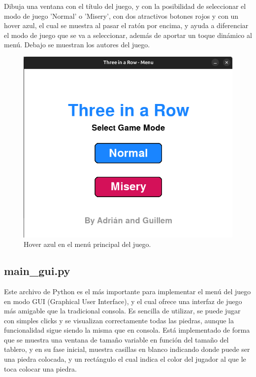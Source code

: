 \documentclass[a4paper,12pt]{article}
\begin{document}
\vspace{\baselineskip}
Dibuja una ventana con el título del juego, y con la posibilidad de seleccionar el modo de juego 'Normal' o 'Misery', con dos atractivos 
botones rojos y con un hover azul, el cual se muestra al pasar el ratón por encima, y ayuda a diferenciar el modo de juego que se va a seleccionar, además de aportar un toque
dinámico al menú. Debajo se muestran los autores del juego.
\begin{figure}[htbp]
    \centering
    \includegraphics[scale=0.5]{./imagenes/menu_inicio2.png}
    \caption{Hover azul en el menú principal del juego.}\label{fig:men_princ2}
\end{figure}

\subsection{main\_gui.py}
Este archivo de Python es el más importante para implementar el menú del juego en modo GUI (Graphical User Interface), y el cual ofrece una interfaz de juego más amigable 
que la tradicional consola. Es sencilla de utilizar, se puede jugar con simples clicks y se visualizan correctamente todas las piedras, aunque la funcionalidad sigue siendo 
la misma que en consola. Está implementado de forma que se muestra una ventana de tamaño variable en función del tamaño del tablero, y en su fase inicial, muestra casillas 
en blanco indicando donde puede ser una piedra colocada, y un rectángulo el cual indica el color del jugador al que le toca colocar una piedra.
\end{document}
